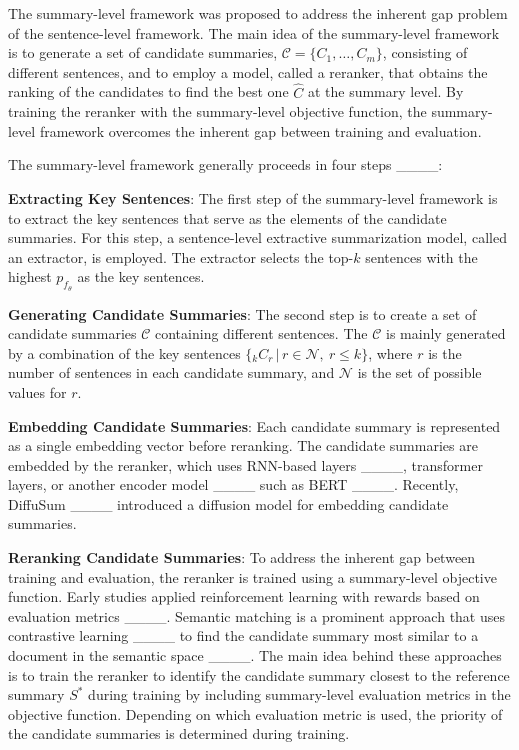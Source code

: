 The summary-level framework was proposed to address the inherent gap problem of the sentence-level framework. The main idea of the summary-level framework is to generate a set of candidate summaries, $\mathcal{C} = \{C_1, \ldots, C_m\}$, consisting of different sentences, and to employ a model, called a reranker, that obtains the ranking of the candidates to find the best one $\hat{C}$ at the summary level. By training the reranker with the summary-level objective function, the summary-level framework overcomes the inherent gap between training and evaluation.

The summary-level framework generally proceeds in four steps ____:

\noindent
\textbf{Extracting Key Sentences}: The first step of the summary-level framework is to extract the key sentences that serve as the elements of the candidate summaries. For this step, a sentence-level extractive summarization model, called an extractor, is employed. The extractor selects the top-$k$ sentences with the highest $p_{f_{\theta}}$ as the key sentences.

\noindent
\textbf{Generating Candidate Summaries}: The second step is to create a set of candidate summaries $\mathcal{C}$ containing different sentences. The $\mathcal{C}$ is mainly generated by a combination of the key sentences $\{{}_{k} C_r \,|\, r \in \mathcal{N},\ r \leq k\}$, where $r$ is the number of sentences in each candidate summary, and $\mathcal{N}$ is the set of possible values for $r$.

\noindent
\textbf{Embedding Candidate Summaries}: Each candidate summary is represented as a single embedding vector before reranking. The candidate summaries are embedded by the reranker, which uses RNN-based layers ____, transformer layers, or another encoder model ____ such as BERT ____. Recently, DiffuSum ____ introduced a diffusion model for embedding candidate summaries.

\noindent
\textbf{Reranking Candidate Summaries}: To address the inherent gap between training and evaluation, the reranker is trained using a summary-level objective function. Early studies applied reinforcement learning with rewards based on evaluation metrics ____. Semantic matching is a prominent approach that uses contrastive learning ____ to find the candidate summary most similar to a document in the semantic space ____. The main idea behind these approaches is to train the reranker to identify the candidate summary closest to the reference summary $S^*$ during training by including summary-level evaluation metrics in the objective function. Depending on which evaluation metric is used, the priority of the candidate summaries is determined during training.

